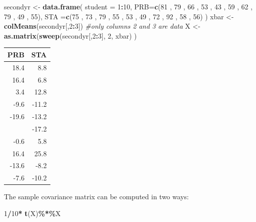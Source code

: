 \documentclass[
]{book}
\newenvironment{Shaded}{\begin{snugshade}}{\end{snugshade}}
\newcommand{\AttributeTok}[1]{\textcolor[rgb]{0.13,0.29,0.53}{#1}}
\newcommand{\CommentTok}[1]{\textcolor[rgb]{0.56,0.35,0.01}{\textit{#1}}}
\newcommand{\DecValTok}[1]{\textcolor[rgb]{0.00,0.00,0.81}{#1}}
\newcommand{\FunctionTok}[1]{\textcolor[rgb]{0.13,0.29,0.53}{\textbf{#1}}}
\newcommand{\NormalTok}[1]{#1}
\newcommand{\OtherTok}[1]{\textcolor[rgb]{0.56,0.35,0.01}{#1}}
\newcommand{\SpecialCharTok}[1]{\textcolor[rgb]{0.81,0.36,0.00}{\textbf{#1}}}
\theoremstyle{definition}
\theoremstyle{definition}
\theoremstyle{definition}
\theoremstyle{definition}
\theoremstyle{remark}
\begin{document}
\begin{Shaded}
\begin{Highlighting}[]
\NormalTok{secondyr }\OtherTok{\textless{}{-}} \FunctionTok{data.frame}\NormalTok{(}
  \AttributeTok{student =} \DecValTok{1}\SpecialCharTok{:}\DecValTok{10}\NormalTok{,}
\AttributeTok{PRB=}\FunctionTok{c}\NormalTok{(}\DecValTok{81}\NormalTok{ , }\DecValTok{79}\NormalTok{ , }\DecValTok{66}\NormalTok{ , }\DecValTok{53}\NormalTok{ , }\DecValTok{43}\NormalTok{ , }\DecValTok{59}\NormalTok{ , }\DecValTok{62}\NormalTok{ , }\DecValTok{79}\NormalTok{ , }\DecValTok{49}\NormalTok{ , }\DecValTok{55}\NormalTok{),}
\AttributeTok{STA =}\FunctionTok{c}\NormalTok{(}\DecValTok{75}\NormalTok{ , }\DecValTok{73}\NormalTok{ , }\DecValTok{79}\NormalTok{ , }\DecValTok{55}\NormalTok{ , }\DecValTok{53}\NormalTok{ , }\DecValTok{49}\NormalTok{ , }\DecValTok{72}\NormalTok{ , }\DecValTok{92}\NormalTok{ , }\DecValTok{58}\NormalTok{ , }\DecValTok{56}\NormalTok{)}
\NormalTok{        )}
\NormalTok{xbar }\OtherTok{\textless{}{-}} \FunctionTok{colMeans}\NormalTok{(secondyr[,}\DecValTok{2}\SpecialCharTok{:}\DecValTok{3}\NormalTok{]) }\CommentTok{\#only columns 2 and 3 are data}
\NormalTok{X }\OtherTok{\textless{}{-}} \FunctionTok{as.matrix}\NormalTok{(}\FunctionTok{sweep}\NormalTok{(secondyr[,}\DecValTok{2}\SpecialCharTok{:}\DecValTok{3}\NormalTok{], }\DecValTok{2}\NormalTok{, xbar) ) }
\end{Highlighting}
\end{Shaded}

\begin{table}
\centering
\begin{tabular}{rr}
\toprule
PRB & STA\\
\midrule
18.4 & 8.8\\
16.4 & 6.8\\
3.4 & 12.8\\
-9.6 & -11.2\\
-19.6 & -13.2\\
\addlinespace
-3.6 & -17.2\\
-0.6 & 5.8\\
16.4 & 25.8\\
-13.6 & -8.2\\
-7.6 & -10.2\\
\bottomrule
\end{tabular}
\end{table}

The sample covariance matrix can be computed in two ways:

\begin{Shaded}
\begin{Highlighting}[]
\DecValTok{1}\SpecialCharTok{/}\DecValTok{10}\SpecialCharTok{*} \FunctionTok{t}\NormalTok{(X)}\SpecialCharTok{\%*\%}\NormalTok{X}
\end{Highlighting}
\end{Shaded}
\end{document}
